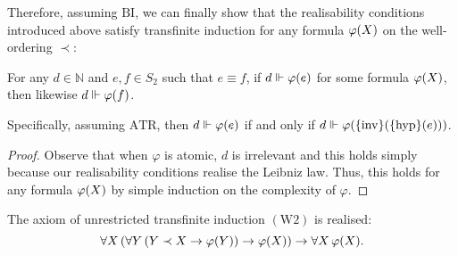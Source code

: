 \documentclass[11pt]{article}
\theoremstyle{plain}
\theoremstyle{definition}
\begin{document}
Therefore, assuming $\mathrm{BI}$, we can finally show that the realisability conditions introduced above satisfy transfinite induction for any formula $\varphi\mleft(X\mright)$ on the well-ordering $\prec$:

\begin{lemma}[$\AC$]
    \label{lem:realise-equivalent-parameters}
    For any $d \in \mathbb{N}$ and $e, f \in S_2$ such that $e \equiv f$, if $d \Vdash \varphi\mleft(e\mright)$ for some formula $\varphi\mleft(X\mright)$, then likewise $d \Vdash \varphi\mleft(f\mright)$.

    Specifically, assuming $\mathrm{ATR}$, then $d \Vdash \varphi\mleft(e\mright)$ if and only if $d \Vdash \varphi\mleft(\mleft\{\mathrm{inv}\mright\}\mleft(\mleft\{\mathrm{hyp}\mright\}\mleft(e\mright)\mright)\mright)$.
\end{lemma}

\begin{proof}
    Observe that when $\varphi$ is atomic, $d$ is irrelevant and this holds simply because our realisability conditions realise the Leibniz law. Thus, this holds for any formula $\varphi\mleft(X\mright)$ by simple induction on the complexity of $\varphi$.
\end{proof}

\begin{proposition}[$\mathrm{BI}$]
    The axiom of unrestricted transfinite induction $\left(\mathrm{W}2\right)$ is realised:
    \[\forall X \left(\forall Y \left(Y \prec X \rightarrow \varphi\mleft(Y\mright)\right) \rightarrow \varphi\mleft(X\mright)\right) \rightarrow \forall X \, \varphi\mleft(X\mright).\]
\end{proposition}
\end{document}
